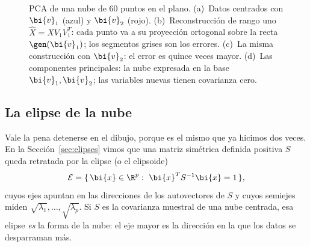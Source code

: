 \begin{figure}[!htb]
\vspace{6pt}
\hfill
{}
\caption{PCA de una nube de $60$ puntos en el plano. (a)~Datos centrados con
$\bi{v}_1$ (azul) y $\bi{v}_2$ (rojo). (b)~Reconstrucción de rango uno $\widehat X=XV_1V_1^T$:
cada punto va a su proyección ortogonal sobre la recta $\gen(\bi{v}_1)$; los
segmentos grises son los errores. (c)~La misma construcción con $\bi{v}_2$: el
error es quince veces mayor. (d)~Las componentes principales: la nube
expresada en la base $\bi{v}_1,\bi{v}_2$; las variables nuevas tienen covarianza cero.}
\label{pca-fig:pca2d}
\end{figure}
\endgroup

\subsection{La elipse de la nube}\label{pca-sec:elipse}

Vale la pena detenerse en el dibujo, porque es el mismo que ya hicimos dos
veces. En la Sección~\ref{sec:elipses} vimos que una matriz simétrica definida
positiva $S$ queda retratada por la elipse (o el elipsoide)
\[
\mathcal E=\{\,\bi{x}\in\R^p:\ \bi{x}^TS^{-1}\bi{x}=1\,\} ,
\]
cuyos ejes apuntan en las direcciones de los autovectores de $S$ y cuyos
semiejes miden $\sqrt{\lambda_1},\dots,\sqrt{\lambda_p}$. Si $S$ es la
covarianza muestral de una nube centrada, esa elipse \emph{es} la forma de la
nube: el eje mayor es la dirección en la que los datos se desparraman más.

